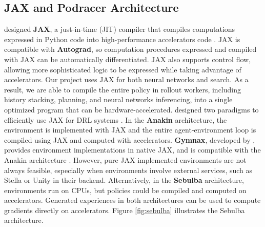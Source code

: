\subsection{JAX and Podracer Architecture} \label{sec:jax_and_podracer}
\citeauthor{CompilingMachineLearning_Frostig.Johnson.ea_2018} designed \textbf{JAX}, a just-in-time (JIT) compiler that compiles computations expressed in Python code into high-performance accelerators code \cite{CompilingMachineLearning_Frostig.Johnson.ea_2018}.
JAX is compatible with \textbf{Autograd}, so computation procedures expressed and compiled with JAX can be automatically differentiated.
JAX also supports control flow, allowing more sophisticated logic to be expressed while taking advantage of accelerators.
Our project uses JAX for both neural networks and search.
As a result, we are able to compile the entire policy in rollout workers, including history stacking, planning, and neural networks inferencing, into a single optimized program that can be hardware-accelerated.
\citeauthor{PodracerArchitecturesScalable_Hessel.Kroiss.ea_2021} designed two paradigms to efficiently use JAX for DRL systems \cite{PodracerArchitecturesScalable_Hessel.Kroiss.ea_2021}.
In the \textbf{Anakin} architecture, the environment is implemented with JAX and the entire agent-environment loop is compiled using JAX and computed with accelerators.
\textbf{Gymnax}, developed by \citeauthor{GymnaxJAXbasedReinforcement_RobertTjarkoLange_2022}, provides environment implementations in native JAX, and is compatible with the Anakin architecture \cite{GymnaxJAXbasedReinforcement_RobertTjarkoLange_2022}.
However, pure JAX implemented environments are not always feasible, especially when environments involve external services, such as Stella or Unity in their backend.
Alternatively, in the \textbf{Sebulba} architecture, environments run on CPUs, but policies could be compiled and computed on accelerators.
Generated experiences in both architectures can be used to compute gradients directly on accelerators.
Figure \ref{fig:sebulba} illustrates the Sebulba architecture.
